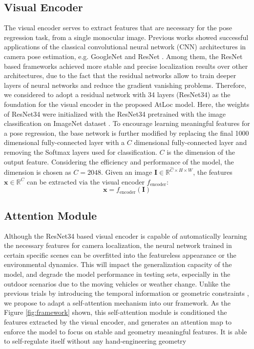 \documentclass[letterpaper]{article}
\begin{document}
\subsection{Visual Encoder}
The visual encoder serves to extract features that are necessary for the pose regression task, from a single monocular image.
Previous works\cite{kendall2017geometric,brahmbhatt2018geometry} showed successful applications of the classical convolutional neural network (CNN) architectures in camera pose estimation, e.g. GoogleNet \cite{szegedy2015going} and ResNet \cite{he2016deep}. 
Among them, the ResNet based \cite{brahmbhatt2018geometry} frameworks achieved more stable and precise localization results over other architectures, due to the fact that the residual networks allow to train deeper layers of neural networks and reduce the gradient vanishing problems. Therefore, we considered to adopt a residual network with 34 layers (ResNet34) as the foundation for the visual encoder in the proposed AtLoc model.
Here, the weights of ResNet34 were initialized with the ResNet34 pretrained with the image classification on ImageNet dataset \cite{imagenet}. 
To encourage learning meaningful features for a pose regression, the base network is further modified by replacing the final 1000 dimensional fully-connected layer with a $C$ dimensional fully-connected layer and removing the Softmax layers used for classification. $C$ is the dimension of the output feature. Considering the efficiency and performance of the model, the dimension is chosen as $C=2048$. Given an image $\mathbf{I} \in \mathbb{R}^{\hat{C} \times H \times W}$, the features $\mathbf{x} \in \mathbb{R}^{C}$ can be extracted via the visual encoder $f_{\text{encoder}}$:
\begin{equation}
    \mathbf{x} = f_{\text{encoder}} (\mathbf{I})
\end{equation}



\subsection{Attention Module}
Although the ResNet34 based visual encoder is capable of automatically learning the necessary features for camera localization, the neural network trained in certain specific scenes can be overfitted into the featureless appearance or the environmental dynamics. This will impact the generalization capacity of the model, and degrade the model performance in testing sets, especially in the outdoor scenarios due to the moving vehicles or weather change. Unlike the previous trials by introducing the temporal information \cite{clark2017vidloc} or geometric constraints \cite{brahmbhatt2018geometry}, we propose to adapt a self-attention mechanism into our framework. As the Figure \ref{fig:framework} shown, this self-attention module is conditioned the features extracted by the visual encoder, and generates an attention map to enforce the model to focus on stable and geometry meaningful features. 
It is able to self-regulate itself without any hand-engineering geometry 
\end{document}
